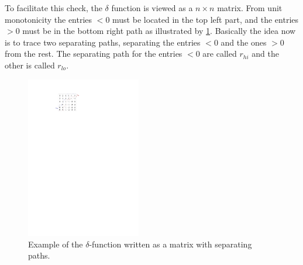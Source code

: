 \documentclass[twoside,11pt,openright]{report}
\begin{document}
To facilitate this check, the $\delta$ function is viewed as a $n \times n$ matrix. From unit monotonicity the entries $< 0$ must be located in the top left part, and the entries $> 0$ must be in the bottom right path as illustrated by \cref{fig:delta-example}. Basically the idea now is to trace two separating paths, separating the entries $< 0$ and the ones $> 0$ from the rest. The separating path for the entries $< 0$ are called $r_{hi}$ and the other is called $r_{lo}$.

\begin{figure}[!htb]
  \centering
  \includegraphics[width=5cm]{images/delta-matrix}
  \caption{Example of the $\delta$-function written as a matrix with separating paths.}
  \label{fig:delta-example}
\end{figure}
\end{document}
